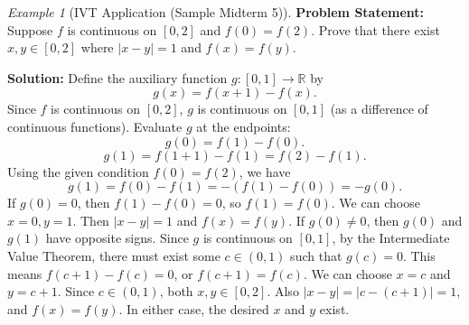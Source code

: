 \documentclass{article}
\theoremstyle{definition}
\theoremstyle{plain}
\theoremstyle{remark}
\newtheorem{example}{Example}[section]
\newcommand{\R}{\mathbb{R}}
\begin{document}
\begin{example}[IVT Application (Sample Midterm 5)]
\textbf{Problem Statement:} Suppose \(f\) is continuous on \([0,2]\) and \(f(0)=f(2)\). Prove that there exist \(x, y \in [0,2]\) where \(|x-y|=1\) and \(f(x)=f(y)\).

\textbf{Solution:} Define the auxiliary function \(g: [0, 1] \to \R\) by
\[ g(x) = f(x+1) - f(x). \]
Since \(f\) is continuous on \([0, 2]\), \(g\) is continuous on \([0, 1]\) (as a difference of continuous functions).
Evaluate \(g\) at the endpoints:
\[ g(0) = f(1) - f(0). \]
\[ g(1) = f(1+1) - f(1) = f(2) - f(1). \]
Using the given condition \(f(0) = f(2)\), we have
\[ g(1) = f(0) - f(1) = -(f(1) - f(0)) = -g(0). \]
If \(g(0) = 0\), then \(f(1) - f(0) = 0\), so \(f(1) = f(0)\). We can choose \(x=0, y=1\). Then \(|x-y|=1\) and \(f(x)=f(y)\).
If \(g(0) \ne 0\), then \(g(0)\) and \(g(1)\) have opposite signs. Since \(g\) is continuous on \([0, 1]\), by the Intermediate Value Theorem, there must exist some \(c \in (0, 1)\) such that \(g(c) = 0\).
This means \(f(c+1) - f(c) = 0\), or \(f(c+1) = f(c)\).
We can choose \(x=c\) and \(y=c+1\). Since \(c \in (0, 1)\), both \(x, y \in [0, 2]\). Also \(|x-y| = |c - (c+1)| = 1\), and \(f(x)=f(y)\).
In either case, the desired \(x\) and \(y\) exist.
\end{example}
\end{document}
